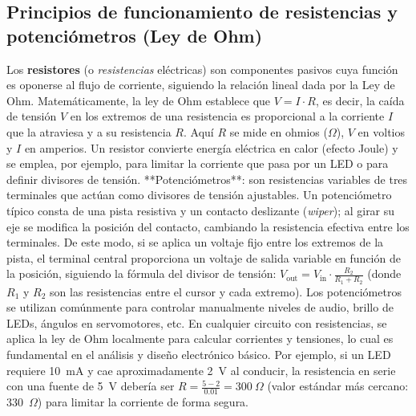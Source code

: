 \documentclass{article}
\begin{document}
\subsection{Principios de funcionamiento de resistencias y potenciómetros (Ley de Ohm)}
Los \textbf{resistores} (o \textit{resistencias} eléctricas) son componentes pasivos cuya función es oponerse al flujo de corriente, siguiendo la relación lineal dada por la Ley de Ohm. Matemáticamente, la ley de Ohm establece que $V = I \cdot R$, es decir, la caída de tensión $V$ en los extremos de una resistencia es proporcional a la corriente $I$ que la atraviesa y a su resistencia $R$.\cite{Alexander2017} Aquí $R$ se mide en ohmios ($\Omega$), $V$ en voltios y $I$ en amperios. Un resistor convierte energía eléctrica en calor (efecto Joule) y se emplea, por ejemplo, para limitar la corriente que pasa por un LED o para definir divisores de tensión. **Potenciómetros**: son resistencias variables de tres terminales que actúan como divisores de tensión ajustables. Un potenciómetro típico consta de una pista resistiva y un contacto deslizante (\textit{wiper}); al girar su eje se modifica la posición del contacto, cambiando la resistencia efectiva entre los terminales. De este modo, si se aplica un voltaje fijo entre los extremos de la pista, el terminal central proporciona un voltaje de salida variable en función de la posición, siguiendo la fórmula del divisor de tensión: $V_{\text{out}} = V_{\text{in}} \cdot \frac{R_2}{R_1+R_2}$ (donde $R_1$ y $R_2$ son las resistencias entre el cursor y cada extremo). Los potenciómetros se utilizan comúnmente para controlar manualmente niveles de audio, brillo de LEDs, ángulos en servomotores, etc. En cualquier circuito con resistencias, se aplica la ley de Ohm localmente para calcular corrientes y tensiones, lo cual es fundamental en el análisis y diseño electrónico básico.\cite{Alexander2017} Por ejemplo, si un LED requiere 10~mA y cae aproximadamente 2~V al conducir, la resistencia en serie con una fuente de 5~V debería ser $R = \frac{5-2}{0.01} = 300~\Omega$ (valor estándar más cercano: 330~$\Omega$) para limitar la corriente de forma segura.\cite{Alexander2017}
\end{document}
